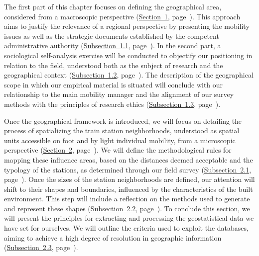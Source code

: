 \begin{refsegment}
The first part of this chapter focuses on defining the geographical area, considered from a macroscopic perspective (\hyperref[chap3:region-hauts-de-france]{Section~1}, page~\pageref{chap3:region-hauts-de-france}). This approach aims to justify the relevance of a regional perspective by presenting the mobility issues as well as the strategic documents established by the competent administrative authority (\hyperref[chap3:regard-privilegie-region-hdf]{Subsection~1.1}, page~\pageref{chap3:regard-privilegie-region-hdf}). In the second part, a sociological self-analysis exercise will be conducted to objectify our positioning in relation to the field, understood both as the subject of research and the geographical context (\hyperref[chap3:auto-analyse-sociologique]{Subsection~1.2}, page~\pageref{chap3:auto-analyse-sociologique}). The description of the geographical scope in which our empirical material is situated will conclude with our relationship to the main mobility manager and the alignment of our survey methods with the principles of research ethics (\hyperref[chap3:preparation-terrain-geographique]{Subsection~1.3}, page~\pageref{chap3:preparation-terrain-geographique}).%

Once the geographical framework is introduced, we will focus on detailing the process of spatializing the train station neighborhoods, understood as spatial units accessible on foot and by light individual mobility, from a microscopic perspective (\hyperref[chap3:quartiers-gare]{Section~2}, page~\pageref{chap3:quartiers-gare}). We will define the methodological rules for mapping these influence areas, based on the distances deemed acceptable and the typology of the stations, as determined through our field survey (\hyperref[chap3:quartiers-gare-distances]{Subsection~2.1}, page~\pageref{chap3:quartiers-gare-distances}). Once the sizes of the station neighborhoods are defined, our attention will shift to their shapes and boundaries, influenced by the characteristics of the built environment. This step will include a reflection on the methods used to generate and represent these shapes (\hyperref[chap3:quartiers-gare-formes]{Subsection~2.2}, page~\pageref{chap3:quartiers-gare-formes}). To conclude this section, we will present the principles for extracting and processing the geostatistical data we have set for ourselves. We will outline the criteria used to exploit the databases, aiming to achieve a high degree of resolution in geographic information (\hyperref[chap3:quartiers-gare-analyse-geostatistique]{Subsection~2.3}, page~\pageref{chap3:quartiers-gare-analyse-geostatistique}).%


\end{refsegment}
